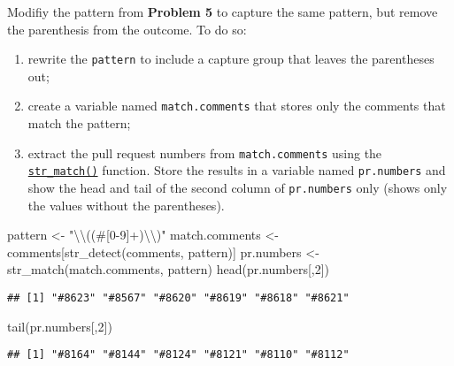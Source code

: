 \documentclass[
]{article}
\newenvironment{Shaded}{\begin{snugshade}}{\end{snugshade}}
\newcommand{\DecValTok}[1]{\textcolor[rgb]{0.00,0.00,0.81}{#1}}
\newcommand{\FunctionTok}[1]{\textcolor[rgb]{0.00,0.00,0.00}{#1}}
\newcommand{\NormalTok}[1]{#1}
\newcommand{\OtherTok}[1]{\textcolor[rgb]{0.56,0.35,0.01}{#1}}
\newcommand{\SpecialCharTok}[1]{\textcolor[rgb]{0.00,0.00,0.00}{#1}}
\newcommand{\StringTok}[1]{\textcolor[rgb]{0.31,0.60,0.02}{#1}}
\providecommand{\tightlist}{%
  \setlength{\itemsep}{0pt}\setlength{\parskip}{0pt}}
\begin{document}
Modifiy the pattern from \textbf{Problem 5} to capture the same pattern,
but remove the parenthesis from the outcome. To do so:

\begin{enumerate}
\def\labelenumi{\arabic{enumi}.}
\tightlist
\item
  rewrite the \texttt{pattern} to include a capture group that leaves
  the parentheses out;
\item
  create a variable named \texttt{match.comments} that stores only the
  comments that match the pattern;
\item
  extract the pull request numbers from \texttt{match.comments} using
  the
  \href{https://stringr.tidyverse.org/reference/str_match.html}{\texttt{str\_match()}}
  function. Store the results in a variable named \texttt{pr.numbers}
  and show the head and tail of the second column of \texttt{pr.numbers}
  only (shows only the values without the parentheses).
\end{enumerate}

\begin{Shaded}
\begin{Highlighting}[]
\NormalTok{pattern }\OtherTok{\textless{}{-}} \StringTok{"}\SpecialCharTok{\textbackslash{}\textbackslash{}}\StringTok{((\#[0{-}9]+)}\SpecialCharTok{\textbackslash{}\textbackslash{}}\StringTok{)"}
\NormalTok{match.comments }\OtherTok{\textless{}{-}}\NormalTok{ comments[}\FunctionTok{str\_detect}\NormalTok{(comments, pattern)]}
\NormalTok{pr.numbers }\OtherTok{\textless{}{-}} \FunctionTok{str\_match}\NormalTok{(match.comments, pattern)}
\FunctionTok{head}\NormalTok{(pr.numbers[,}\DecValTok{2}\NormalTok{])}
\end{Highlighting}
\end{Shaded}

\begin{verbatim}
## [1] "#8623" "#8567" "#8620" "#8619" "#8618" "#8621"
\end{verbatim}

\begin{Shaded}
\begin{Highlighting}[]
\FunctionTok{tail}\NormalTok{(pr.numbers[,}\DecValTok{2}\NormalTok{])}
\end{Highlighting}
\end{Shaded}

\begin{verbatim}
## [1] "#8164" "#8144" "#8124" "#8121" "#8110" "#8112"
\end{verbatim}
\end{document}
